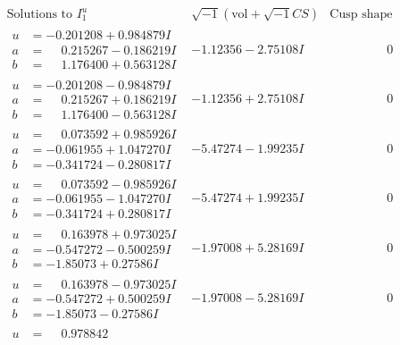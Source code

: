 \documentclass[1p]{elsarticle_modified}
\theoremstyle{definition}
\newcommand{\I}{\sqrt{-1}}
\begin{document}
$$\begin{array}{c|c|c}  
\text{Solutions to }I^u_{1}& \I (\text{vol} + \sqrt{-1}CS) & \text{Cusp shape}\\
 \hline 
\begin{aligned}
u &= -0.201208 + 0.984879 I \\
a &= \phantom{-}0.215267 - 0.186219 I \\
b &= \phantom{-}1.176400 + 0.563128 I\end{aligned}
 & -1.12356 - 2.75108 I & \phantom{-0.000000 } 0 \\ \hline\begin{aligned}
u &= -0.201208 - 0.984879 I \\
a &= \phantom{-}0.215267 + 0.186219 I \\
b &= \phantom{-}1.176400 - 0.563128 I\end{aligned}
 & -1.12356 + 2.75108 I & \phantom{-0.000000 } 0 \\ \hline\begin{aligned}
u &= \phantom{-}0.073592 + 0.985926 I \\
a &= -0.061955 + 1.047270 I \\
b &= -0.341724 - 0.280817 I\end{aligned}
 & -5.47274 - 1.99235 I & \phantom{-0.000000 } 0 \\ \hline\begin{aligned}
u &= \phantom{-}0.073592 - 0.985926 I \\
a &= -0.061955 - 1.047270 I \\
b &= -0.341724 + 0.280817 I\end{aligned}
 & -5.47274 + 1.99235 I & \phantom{-0.000000 } 0 \\ \hline\begin{aligned}
u &= \phantom{-}0.163978 + 0.973025 I \\
a &= -0.547272 - 0.500259 I \\
b &= -1.85073 + 0.27586 I\end{aligned}
 & -1.97008 + 5.28169 I & \phantom{-0.000000 } 0 \\ \hline\begin{aligned}
u &= \phantom{-}0.163978 - 0.973025 I \\
a &= -0.547272 + 0.500259 I \\
b &= -1.85073 - 0.27586 I\end{aligned}
 & -1.97008 - 5.28169 I & \phantom{-0.000000 } 0 \\ \hline\begin{aligned}
u &= \phantom{-}0.978842\phantom{ +0.000000I} \\

\end{aligned}
\end{array}$$
\end{document}
